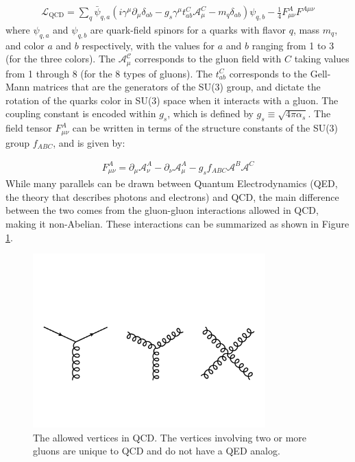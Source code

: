 \begin{align}
\mathcal{{L}}_{\mathrm{QCD}} = \sum_q \bar{\psi}_{q,a} (i \gamma^\mu \partial_\mu \delta_{ab} - g_s \gamma^\mu t_{ab}^C \mathcal{A}_\mu^C - m_q \delta_{ab}) \psi_{q,b} - \frac{1}{4} F_{\mu\nu}^A F^{A \mu\nu}
\end{align}
where $\psi_{q,a}$ and $\psi_{q,b}$ are quark-field spinors for a quarks with flavor $q$, mass $m_q$, and color $a$ and $b$ respectively, with the values for $a$ and $b$ ranging  from 1 to 3 (for the three colors).
The $\mathcal{A_\mu^C}$ corresponds to the gluon field with $C$ taking values from 1 through 8 (for the 8 types of gluons).
The $t_{ab}^C$ corresponds to the Gell-Mann matrices that are the generators of the SU(3) group, and dictate the rotation of the quarks color in SU(3) space when it interacts with a gluon.
The coupling constant is encoded within $g_s$, which is defined by $g_s \equiv \sqrt{4 \pi \alpha_s}$.
The field tensor $F_{\mu\nu}^A$ can be written in terms of the structure constants of the SU(3) group $f_{ABC}$, and is given by:

\begin{align}
F_{\mu\nu}^A = \partial_\mu \mathcal{A}_\nu^A - \partial_\nu \mathcal{A}_\mu^A - g_s f_{ABC} \mathcal{A}^B \mathcal{A}^C
\end{align}
While many parallels can be drawn between Quantum Electrodynamics (QED, the theory that describes photons and electrons) and QCD, the main difference between the two comes from the gluon-gluon interactions allowed in QCD, making it non-Abelian.
These interactions can be summarized as shown in Figure \ref{fig:qcd_diagrams}.

\begin{figure}[htbp]
\begin{center}
\includegraphics[width=0.8\textwidth]{figures/theory/qcd_diagrams}
\caption{The allowed vertices in QCD.
The vertices involving two or more gluons are unique to QCD and do not have a QED analog.}
\label{fig:qcd_diagrams}
\end{center}
\end{figure}

